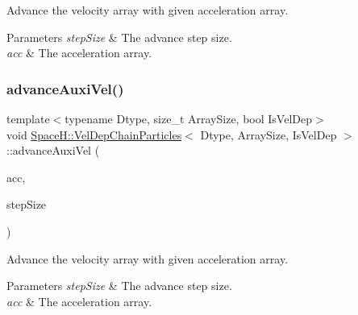 Advance the velocity array with given acceleration array. 


\begin{DoxyParams}{Parameters}
{\em step\+Size} & The advance step size. \\
\hline
{\em acc} & The acceleration array. \\
\hline
\end{DoxyParams}
\mbox{\label{class_space_h_1_1_vel_dep_chain_particles_a7dae0ccc9035be9e37e45d45b030a89c}} 
\subsubsection{\texorpdfstring{advance\+Auxi\+Vel()}{advanceAuxiVel()}\hspace{0.1cm}{\footnotesize\ttfamily [2/2]}}
{\footnotesize\ttfamily template$<$typename Dtype, size\+\_\+t Array\+Size, bool Is\+Vel\+Dep$>$ \\
void \mbox{\hyperlink{class_space_h_1_1_vel_dep_chain_particles}{Space\+H\+::\+Vel\+Dep\+Chain\+Particles}}$<$ Dtype, Array\+Size, Is\+Vel\+Dep $>$\+::advance\+Auxi\+Vel (\begin{DoxyParamCaption}\item[{const \mbox{\hyperlink{class_space_h_1_1_vel_indep_particles_aa9983058940249df8b00fa800e8cbad2}{Vector\+Array}} \&}]{acc,  }\item[{\mbox{\hyperlink{class_space_h_1_1_vel_indep_particles_aeb47d8131b30ed790320ff634f0d6af1}{Scalar}}}]{step\+Size }\end{DoxyParamCaption})\hspace{0.3cm}{\ttfamily [inline]}}



Advance the velocity array with given acceleration array. 


\begin{DoxyParams}{Parameters}
{\em step\+Size} & The advance step size. \\
\hline
{\em acc} & The acceleration array. \\
\hline
\end{DoxyParams}
\mbox{\label{class_space_h_1_1_vel_dep_chain_particles_a36387410e94b04978444b572da9f9104}} 
